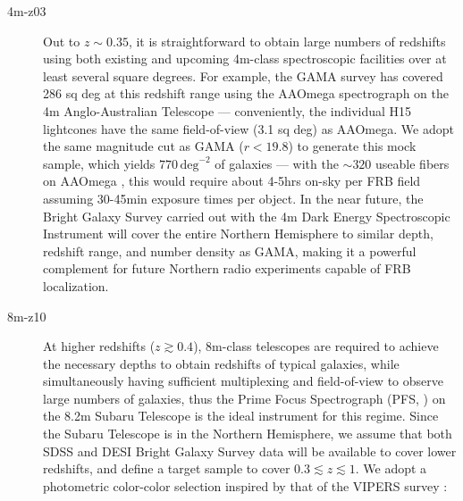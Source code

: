 \documentclass[twocolumn]{aastex63}
\newcommand{\persqdeg}{\ensuremath{\mathrm{deg}^{-2}}}
\begin{document}
\begin{CJK*}{UTF8}{gbsn}
\begin{description}
\item[\hspace{20pt}\MakeLowercase{4m-z03}] Out to $z\sim 0.35$, it is straightforward to obtain large numbers of redshifts using both existing and upcoming 4m-class
spectroscopic facilities over at least several square degrees. For example, the GAMA survey \citep{driver:2011, liske:2015} has covered 286 sq
deg at this redshift range using the AAOmega spectrograph on the 4m Anglo-Australian Telescope --- conveniently, the individual H15 lightcones have the same field-of-view (3.1 sq deg) as AAOmega. We adopt the same magnitude cut
as GAMA  ($r < 19.8$) to generate this mock sample, which yields $770\,\persqdeg$ of galaxies --- with the $\sim 320$ useable fibers on AAOmega \citep{liske:2015}, this would require about
4-5hrs on-sky per FRB field assuming 30-45min exposure times per object.
In the near future, the Bright Galaxy Survey carried out with the 4m Dark Energy Spectroscopic Instrument \citep[DESI, ][]{levi:2013,desi-collaboration:2016} will cover the entire Northern Hemisphere to similar depth, redshift range,
and number density as GAMA, making it a powerful complement for future Northern radio experiments capable of FRB localization. 


\item[\hspace{20pt}\MakeLowercase{8m-z10}]
At higher redshifts ($z\gtrsim 0.4$), 8m-class telescopes are required to achieve the necessary depths to obtain redshifts of typical galaxies,
while simultaneously having sufficient multiplexing and field-of-view to observe large numbers of galaxies,
thus the Prime Focus Spectrograph (PFS, \citealt{sugai:2015}) on the 8.2m Subaru Telescope is the ideal instrument for this regime. 
Since the Subaru Telescope is in the Northern Hemisphere, we assume that both SDSS
and DESI Bright Galaxy Survey data will be available to cover lower redshifts, and define a target sample to cover $0.3 \lesssim z \lesssim 1$. 
We adopt a photometric color-color selection inspired by that of the VIPERS survey \citep{guzzo:2014}:


\end{description}
\end{CJK*}
\end{document}
